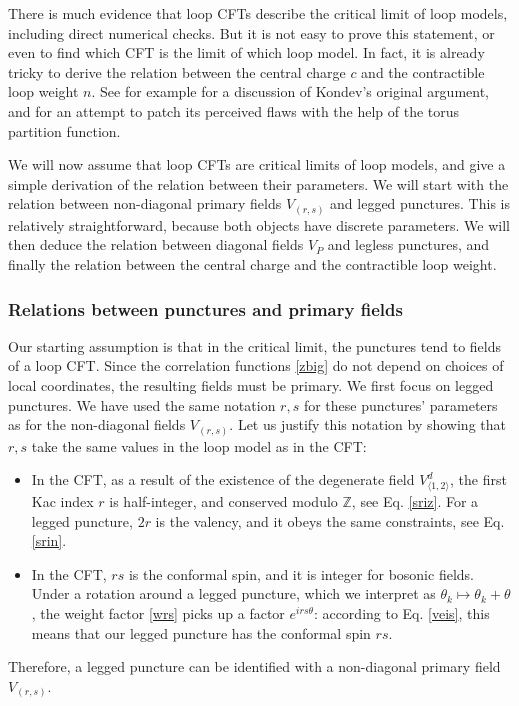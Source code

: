 \documentclass[12pt, a4paper]{article}
\begin{document}
There is much evidence that loop CFTs describe the critical limit of loop models, including direct numerical checks. But it is not easy to prove this statement, or even to find which CFT is the limit of which loop model. In fact, it is already tricky to derive the relation between the central charge $c$ and the contractible loop weight $n$. See for example \cite[Appendix A]{grz18} for a discussion of Kondev's original argument, and for an attempt to patch its perceived flaws with the help of the torus partition function.

We will now assume that loop CFTs are critical limits of loop models, and give a simple derivation of the relation between their parameters. We will start with the relation between non-diagonal primary fields $V_{(r,s)}$ and legged punctures. This is relatively straightforward, because both objects have discrete parameters. We will then deduce the relation between diagonal fields $V_P$ and legless punctures, and finally the relation between the central charge and the contractible loop weight.

\subsubsection{Relations between punctures and primary fields}

Our starting assumption is that in the critical limit, the punctures tend to fields of a loop CFT.
Since the correlation functions \eqref{zbig} do not depend on choices of local coordinates, the resulting fields must be primary. We first focus on legged punctures. We have used the same notation $r,s$ for these punctures' parameters as for the non-diagonal fields $V_{(r,s)}$. Let us justify this notation by showing that $r,s$ take the same values in the loop model as in the CFT:
\begin{itemize}
 \item In the CFT, as a result of the existence of the degenerate field $V^d_{\langle 1,2\rangle}$, the first Kac index $r$ is half-integer, and conserved modulo $\mathbb{Z}$, see Eq. \eqref{sriz}. For a legged puncture, $2r$ is the valency, and it obeys the same constraints, see Eq. \eqref{srin}.
 \item In the CFT, $rs$ is the conformal spin, and it is integer for bosonic fields. Under a rotation around a legged puncture, which we interpret as $\theta_k\mapsto \theta_k + \theta$, the weight factor \eqref{wrs} picks up a factor $e^{irs\theta}$: according to Eq. \eqref{veis}, this means that our legged puncture has the conformal spin $rs$.
\end{itemize}
Therefore, a legged puncture can be identified with a non-diagonal primary field $V_{(r,s)}$.
\end{document}
